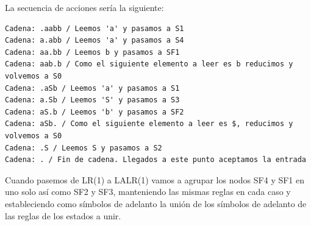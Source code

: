 \documentclass[nochap]{apuntes}
\begin{document}
\begin{problem}
\ppart
La secuencia de acciones sería la siguiente:
\begin{verbatim}
Cadena: .aabb / Leemos 'a' y pasamos a S1
Cadena: a.abb / Leemos 'a' y pasamos a S4
Cadena: aa.bb / Leemos b y pasamos a SF1
Cadena: aab.b / Como el siguiente elemento a leer es b reducimos y volvemos a S0
Cadena: .aSb / Leemos 'a' y pasamos a S1
Cadena: a.Sb / Leemos 'S' y pasamos a S3
Cadena: aS.b / Leemos 'b' y pasamos a SF2
Cadena: aSb. / Como el siguiente elemento a leer es $, reducimos y volvemos a S0
Cadena: .S / Leemos S y pasamos a S2
Cadena: . / Fin de cadena. Llegados a este punto aceptamos la entrada
\end{verbatim}

\ppart
Cuando pasemos de LR(1) a LALR(1) vamos a agrupar los nodos SF4 y SF1 en uno solo así como SF2 y SF3, manteniendo las mismas reglas en cada caso y estableciendo como símbolos de adelanto la unión de los símbolos de adelanto de las reglas de los estados a unir.
\end{problem}
\end{document}
